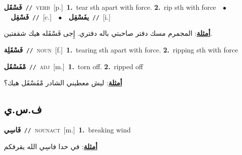 \documentclass[10pt,a4paper,twoside]{article} %
\begin{document}
\begin{multicols}{2}
{\setlength\topsep{0pt}\textbf{\foreignlanguage{arabic}{فَسْقَل}}\ {\color{gray}\texttt{//}\color{black}}\ \textsc{verb}\ [p.]\ \textbf{1.}~tear sth apart with force.  \textbf{2.}~rip sth with force\ \ $\bullet$\ \ \setlength\topsep{0pt}\textbf{\foreignlanguage{arabic}{فَسْقِل}}\ {\color{gray}\texttt{//}\color{black}}\ [c.]\ \ $\bullet$\ \ \setlength\topsep{0pt}\textbf{\foreignlanguage{arabic}{يفَسْقِل}}\ {\color{gray}\texttt{//}\color{black}}\ [i.]\  \begin{flushright}\color{gray}\foreignlanguage{arabic}{\textbf{\underline{\foreignlanguage{arabic}{أمثلة}}}: المجمرم مسك دفتر صاحبتي باله دفتري. إِجى فَسْقَله هيك شقفتين.}\end{flushright}\color{black}} \vspace{2mm}

{\setlength\topsep{0pt}\textbf{\foreignlanguage{arabic}{فَسْقَلِة}}\ {\color{gray}\texttt{//}\color{black}}\ \textsc{noun}\ [f.]\ \textbf{1.}~tearing sth apart with force.  \textbf{2.}~ripping sth with force\ } \vspace{2mm}

{\setlength\topsep{0pt}\textbf{\foreignlanguage{arabic}{مْفَسْقَل}}\ {\color{gray}\texttt{//}\color{black}}\ \textsc{adj}\ [m.]\ \textbf{1.}~torn off.  \textbf{2.}~ripped off\  \begin{flushright}\color{gray}\foreignlanguage{arabic}{\textbf{\underline{\foreignlanguage{arabic}{أمثلة}}}: ليش معطيني الشادر مْفَسْقَل هيك؟}\end{flushright}\color{black}} \vspace{2mm}

\vspace{-3mm}
\subsection*{\color{blue}\foreignlanguage{arabic}{ف.س.ي}\color{blue}{}} 

{\setlength\topsep{0pt}\textbf{\foreignlanguage{arabic}{فَاسِي}}\ {\color{gray}\texttt{//}\color{black}}\ \textsc{noun\textunderscore act}\ [m.]\ \textbf{1.}~breaking wind\  \begin{flushright}\color{gray}\foreignlanguage{arabic}{\textbf{\underline{\foreignlanguage{arabic}{أمثلة}}}: في حدا فاسِي الله يقرفكم}\end{flushright}\color{black}} \vspace{2mm}


\end{multicols}
\end{document}
